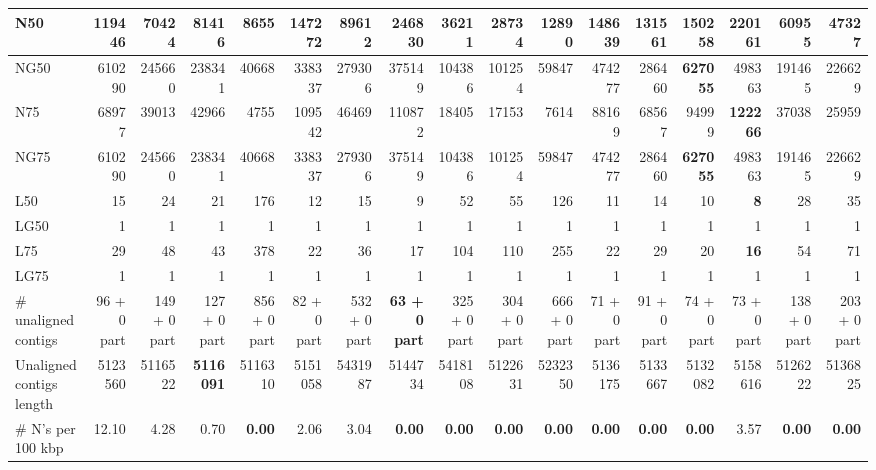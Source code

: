 \documentclass[12pt,a4paper]{article}
\begin{document}
\begin{table}[ht]
\begin{center}
\begin{tabular}{|l*{16}{|r}|}
N50 & 119446 & 70424 & 81416 & 8655 & 147272 & 89612 & {\bf 246830} & 36211 & 28734 & 12890 & 148639 & 131561 & 150258 & 220161 & 60955 & 47327 \\ \hline
NG50 & 610290 & 245660 & 238341 & 40668 & 338337 & 279306 & 375149 & 104386 & 101254 & 59847 & 474277 & 286460 & {\bf 627055} & 498363 & 191465 & 226629 \\ \hline
N75 & 68977 & 39013 & 42966 & 4755 & 109542 & 46469 & 110872 & 18405 & 17153 & 7614 & 88169 & 68567 & 94999 & {\bf 122266} & 37038 & 25959 \\ \hline
NG75 & 610290 & 245660 & 238341 & 40668 & 338337 & 279306 & 375149 & 104386 & 101254 & 59847 & 474277 & 286460 & {\bf 627055} & 498363 & 191465 & 226629 \\ \hline
L50 & 15 & 24 & 21 & 176 & 12 & 15 & 9 & 52 & 55 & 126 & 11 & 14 & 10 & {\bf 8} & 28 & 35 \\ \hline
LG50 & 1 & 1 & 1 & 1 & 1 & 1 & 1 & 1 & 1 & 1 & 1 & 1 & 1 & 1 & 1 & 1 \\ \hline
L75 & 29 & 48 & 43 & 378 & 22 & 36 & 17 & 104 & 110 & 255 & 22 & 29 & 20 & {\bf 16} & 54 & 71 \\ \hline
LG75 & 1 & 1 & 1 & 1 & 1 & 1 & 1 & 1 & 1 & 1 & 1 & 1 & 1 & 1 & 1 & 1 \\ \hline
\# unaligned contigs & 96 + 0 part & 149 + 0 part & 127 + 0 part & 856 + 0 part & 82 + 0 part & 532 + 0 part & {\bf 63 + 0 part} & 325 + 0 part & 304 + 0 part & 666 + 0 part & 71 + 0 part & 91 + 0 part & 74 + 0 part & 73 + 0 part & 138 + 0 part & 203 + 0 part \\ \hline
Unaligned contigs length & 5123560 & 5116522 & {\bf 5116091} & 5116310 & 5151058 & 5431987 & 5144734 & 5418108 & 5122631 & 5232350 & 5136175 & 5133667 & 5132082 & 5158616 & 5126222 & 5136825 \\ \hline
\# N's per 100 kbp & 12.10 & 4.28 & 0.70 & {\bf 0.00} & 2.06 & 3.04 & {\bf 0.00} & {\bf 0.00} & {\bf 0.00} & {\bf 0.00} & {\bf 0.00} & {\bf 0.00} & {\bf 0.00} & 3.57 & {\bf 0.00} & {\bf 0.00} \\ \hline
\end{tabular}
\end{center}
\end{table}
\end{document}

